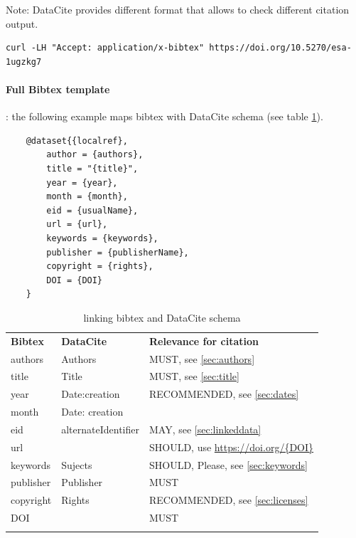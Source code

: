 \documentclass[11pt,a4paper]{ivoa}
\begin{document}

Note: DataCite provides different format that allows to check different citation output.

\begin{verbatim}
curl -LH "Accept: application/x-bibtex" https://doi.org/10.5270/esa-1ugzkg7
\end{verbatim}


\paragraph{Full Bibtex template} : the following example maps bibtex with DataCite schema (see table \ref{tab:astroDOIs1}).

\begin{lstlisting}
	@dataset{{localref},
		author = {authors},
		title = "{title}",
		year = {year},
		month = {month},
		eid = {usualName},
		url = {url},
		keywords = {keywords},
		publisher = {publisherName},
		copyright = {rights},
		DOI = {DOI}
	}
\end{lstlisting}


\begin{table}[th]
	\begin{tabular}{lll}
		\sptablerule
		\textbf{Bibtex} & \textbf{DataCite} & \textbf{Relevance for citation} \\
		\sptablerule
		\sptablerule
	authors & Authors & MUST, see \ref{sec:authors} \\
	title & Title & MUST, see \ref{sec:title}\\
	year &  Date:creation & RECOMMENDED, see \ref{sec:dates} \\
	month & Date: creation & \\
	eid & alternateIdentifier & MAY, see \ref{sec:linkeddata}\\
	url & & SHOULD, use \url{https://doi.org/{DOI}} \\
	keywords & Sujects & SHOULD, Please, see \ref{sec:keywords} \\
	publisher & Publisher & MUST \\
    copyright & Rights & RECOMMENDED, see \ref{sec:licenses} \\
    DOI & & MUST \\
    \sptablerule
	\end{tabular}%
\caption{\label{tab:astroDOIs1}linking bibtex and DataCite schema}
\end{table}
\end{document}
